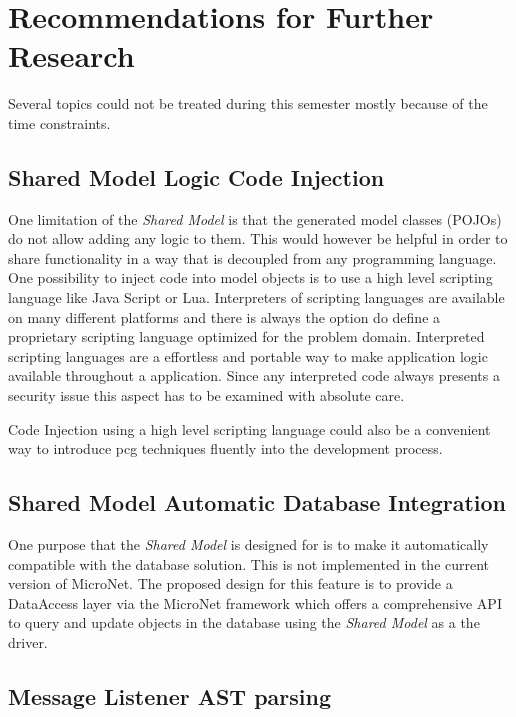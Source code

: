 \section{Recommendations for Further Research}

Several topics could not be treated during this semester mostly because of the
time constraints.

\subsection{Shared Model Logic Code Injection}
\label{sub:model_code_injection}

One limitation of the \textit{Shared Model} is that the generated model classes
(POJOs) do not allow adding any logic to them. This would however be helpful in
order to share functionality in a way that is decoupled from any programming
language. One possibility to inject code into model objects is to use a high
level scripting language like Java Script or Lua. Interpreters of scripting
languages are available on many different platforms and there is always the
option do define a proprietary scripting language optimized for the problem
domain. Interpreted scripting languages are a effortless and portable way to
make application logic available throughout a \ms{} application. Since any
interpreted code always presents a security issue this aspect has to be examined
with absolute care.

Code Injection using a high level scripting language could also be a convenient
way to introduce \gls{pcg} techniques fluently into the \og{} development
process.

\subsection{Shared Model Automatic Database Integration}

One purpose that the \textit{Shared Model} is designed for is to make it
automatically compatible with the database solution. This is not implemented in
the current version of MicroNet. The proposed design for this feature is to
provide a DataAccess layer via the MicroNet framework which offers a
comprehensive API to query and update objects in the database using the
\textit{Shared Model} as a the driver.

\subsection{Message Listener AST parsing}

